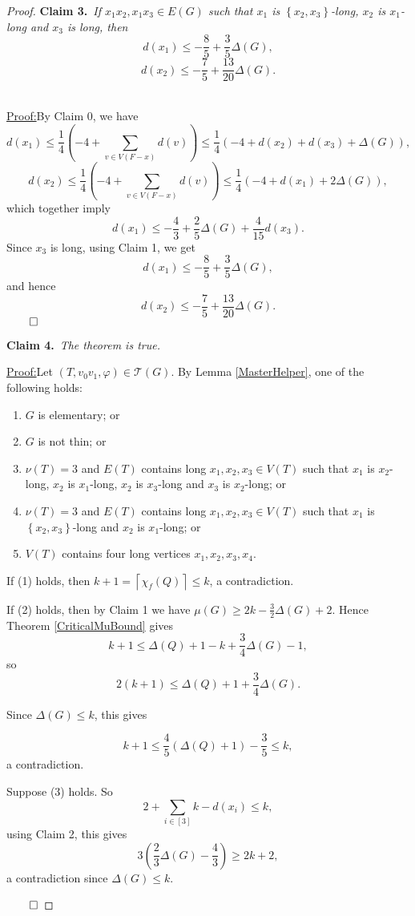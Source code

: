 \documentclass[12pt]{amsart}
\theoremstyle{plain}
\theoremstyle{definition}
\theoremstyle{remark}
\newcommand{\fancy}[1]{\mathcal{#1}}
\newcommand{\T}{\fancy{T}}
\newcommand{\set}[1]{\left\{ #1 \right\}}
\newcommand{\ceil}[1]{\left\lceil#1\right\rceil}
\newcommand{\irange}[1]{\left[#1\right]}
\newcommand{\parens}[1]{\left( #1 \right)}
\newcommand{\vph}{\varphi}
\newcommand{\claim}[2]{{\noindent\bf Claim #1.}~{\it #2}~~}
\newenvironment{claimproof}[1]{\par\noindent\underline{Proof:}\space#1}{\leavevmode\unskip\penalty9999
\hbox{}\nobreak\hfill\quad\hbox{$\qed$}}
\begin{document}
\begin{proof}
\bigskip

\claim{3}{If $x_1x_2, x_1x_3 \in E(G)$ such that $x_1$ is $\set{x_2,x_3}$-long, $x_2$ is $x_1$-long and $x_3$ is long, then 
\[d(x_1) \le -\frac85 + \frac35\Delta(G),\]
\[d(x_2) \le -\frac75 + \frac{13}{20}\Delta(G).\]}

\begin{claimproof}
By Claim 0, we have
\[d(x_1) \le \frac14\parens{-4 + \sum_{v \in V(F-x)} d(v)} \le \frac14\parens{-4 + d(x_2) + d(x_3) + \Delta(G)},\]
\[d(x_2) \le \frac14\parens{-4 + \sum_{v \in V(F-x)} d(v)} \le \frac14\parens{-4 + d(x_1) + 2\Delta(G)},\]
which together imply
\[d(x_1) \le -\frac43 + \frac25\Delta(G) + \frac{4}{15}d(x_3).\]
Since $x_3$ is long, using Claim 1, we get
\[d(x_1) \le -\frac85 + \frac35\Delta(G),\]
and hence
\[d(x_2) \le -\frac75 + \frac{13}{20}\Delta(G).\]
\end{claimproof}
\bigskip

\claim{4}{The theorem is true.}

\begin{claimproof}
Let $(T, v_0v_1, \vph) \in \T(G)$. By Lemma \ref{MasterHelper}, one of the following holds:
\begin{enumerate}
\item $G$ is elementary; or
\item $G$ is not thin; or
\item $\nu(T) = 3$ and $E(T)$ contains long $x_1,x_2,x_3 \in V(T)$ such that $x_1$ is $x_2$-long, $x_2$ is $x_1$-long, $x_2$ is $x_3$-long and $x_3$ is $x_2$-long; or
\item $\nu(T) = 3$ and $E(T)$ contains long $x_1,x_2,x_3 \in V(T)$ such that $x_1$ is $\set{x_2,x_3}$-long and $x_2$ is $x_1$-long; or
\item $V(T)$ contains four long vertices $x_1, x_2, x_3, x_4$.
\end{enumerate}

If (1) holds, then $k + 1 = \ceil{\chi_f(Q)} \le k$, a contradiction.

If (2) holds, then by Claim 1 we have $\mu(G) \ge 2k - \frac32\Delta(G) + 2$.  Hence Theorem \ref{CriticalMuBound} gives
\[k + 1 \le \Delta(Q) + 1 - k + \frac34\Delta(G) - 1,\]
so
\[2(k + 1) \le \Delta(Q) + 1 + \frac34\Delta(G).\]

Since $\Delta(G) \le k$, this gives

\[k + 1 \le \frac45(\Delta(Q) + 1) - \frac35 \le k,\]
a contradiction.

Suppose (3) holds.  So
\[2 + \sum_{i \in \irange{3}} k - d(x_i) \le k,\]
using Claim 2, this gives
\[3\parens{\frac23\Delta(G) -\frac43} \ge 2k+2,\]
a contradiction since $\Delta(G) \le k$.


\end{claimproof}
\end{proof}
\end{document}
